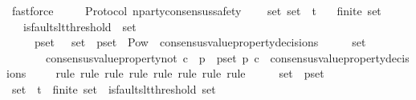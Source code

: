 \begin{isabellebody}
\ fastforce\ \ \ \isanewline
{}\isamarkupfalse%
%
\endisatagproof
{\isafoldproof}%
%
\isadelimproof
\isanewline
%
\endisadelimproof
\isanewline
\isanewline
{}\isamarkupfalse%
\ {\isacharparenleft}\ Protocol{\isacharparenright}\ n{\isacharunderscore}party{\isacharunderscore}consensus{\isacharunderscore}safety\ {\isacharcolon}\isanewline
\ \ {\isachardoublequoteopen}{\isasymforall}\ {\isasymsigma}{\isacharunderscore}set{\isachardot}\ {\isasymsigma}{\isacharunderscore}set\ {\isasymsubseteq}\ {\isasymSigma}t\isanewline
\ \ {\isasymlongrightarrow}\ finite\ {\isasymsigma}{\isacharunderscore}set\isanewline
\ \ {\isasymlongrightarrow}\ is{\isacharunderscore}faults{\isacharunderscore}lt{\isacharunderscore}threshold\ {\isacharparenleft}{\isasymUnion}\ {\isasymsigma}{\isacharunderscore}set{\isacharparenright}\isanewline
\ \ {\isasymlongrightarrow}\ {\isacharparenleft}{\isasymforall}\ {\isasymsigma}\ p{\isacharunderscore}set{\isachardot}\ {\isasymsigma}\ {\isasymin}\ {\isasymsigma}{\isacharunderscore}set\ {\isasymand}\ p{\isacharunderscore}set\ {\isasymin}\ Pow\ {\isacharparenleft}{\isasymUnion}\ {\isacharbraceleft}consensus{\isacharunderscore}value{\isacharunderscore}property{\isacharunderscore}decisions\ {\isasymsigma}{\isacharprime}\ {\isacharbar}\ {\isasymsigma}{\isacharprime}{\isachardot}\ {\isasymsigma}{\isacharprime}\ {\isasymin}\ {\isasymsigma}{\isacharunderscore}set{\isacharbraceright}{\isacharparenright}\ {\isacharminus}\ {\isasymemptyset}\ \isanewline
\ \ \ \ \ \ {\isasymlongrightarrow}\ consensus{\isacharunderscore}value{\isacharunderscore}property{\isacharunderscore}not\ {\isacharparenleft}{\isasymlambda}c{\isachardot}\ {\isasymforall}\ p\ {\isasymin}\ p{\isacharunderscore}set{\isachardot}\ p\ c{\isacharparenright}\ {\isasymnotin}\ consensus{\isacharunderscore}value{\isacharunderscore}property{\isacharunderscore}decisions\ {\isasymsigma}{\isacharparenright}{\isachardoublequoteclose}\isanewline
%
\isadelimproof
\ \ %
\endisadelimproof
%
\isatagproof
{}\isamarkupfalse%
\ {\isacharparenleft}rule{\isacharcomma}\ rule{\isacharcomma}\ rule{\isacharcomma}\ rule{\isacharcomma}\ rule{\isacharcomma}\ rule{\isacharcomma}\ rule{\isacharcomma}\ rule{\isacharparenright}\isanewline
{}\isamarkupfalse%
\ {\isacharminus}\isanewline
\ \ \isamarkupfalse%
\ {\isasymsigma}{\isacharunderscore}set\ {\isasymsigma}\ p{\isacharunderscore}set\isanewline
\ \ \isamarkupfalse%
\ {\isachardoublequoteopen}{\isasymsigma}{\isacharunderscore}set\ {\isasymsubseteq}\ {\isasymSigma}t{\isachardoublequoteclose}\ \ {\isachardoublequoteopen}finite\ {\isasymsigma}{\isacharunderscore}set{\isachardoublequoteclose}\ \ {\isachardoublequoteopen}is{\isacharunderscore}faults{\isacharunderscore}lt{\isacharunderscore}threshold\ {\isacharparenleft}{\isasymUnion}{\isasymsigma}{\isacharunderscore}set{\isacharparenright}{\isachardoublequoteclose}\ \isanewline

\end{isabellebody}
